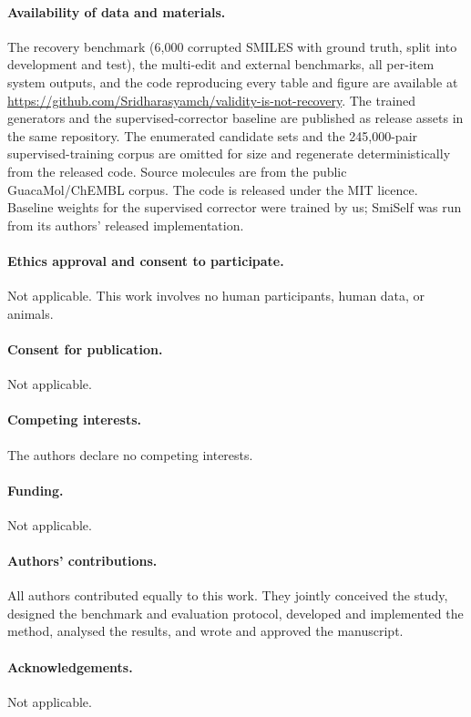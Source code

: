 \documentclass[11pt]{article}
\begin{document}
\paragraph{Availability of data and materials.}
The recovery benchmark (6{,}000 corrupted SMILES with ground truth, split into
development and test), the multi-edit and external benchmarks, all per-item
system outputs, and the code reproducing every table and figure are available at
\url{https://github.com/Sridharasyamch/validity-is-not-recovery}. The trained
generators and the supervised-corrector baseline are published as release assets
in the same repository. The enumerated candidate sets and the 245{,}000-pair
supervised-training corpus are omitted for size and regenerate deterministically
from the released code. Source molecules are from the public GuacaMol/ChEMBL
corpus. The code is released under the MIT licence.
Baseline weights for the supervised corrector were trained by us; SmiSelf was run
from its authors' released implementation.

\paragraph{Ethics approval and consent to participate.}
Not applicable. This work involves no human participants, human data, or animals.

\paragraph{Consent for publication.}
Not applicable.

\paragraph{Competing interests.}
The authors declare no competing interests.

\paragraph{Funding.}
Not applicable.

\paragraph{Authors' contributions.}
All authors contributed equally to this work. They jointly conceived the study,
designed the benchmark and evaluation protocol, developed and implemented the
method, analysed the results, and wrote and approved the manuscript.

\paragraph{Acknowledgements.}
Not applicable.



\end{document}
